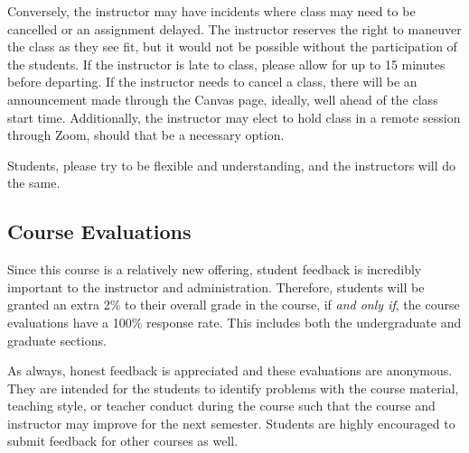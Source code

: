     Conversely, the instructor may have incidents where class may need to be cancelled or an assignment delayed. The instructor reserves the right to maneuver the class as they see fit, but it would not be possible without the participation of the students.
    If the instructor is late to class, please allow for up to 15 minutes before departing.
    If the instructor needs to cancel a class, there will be an announcement made through the Canvas page, ideally, well ahead of the class start time.
    Additionally, the instructor may elect to hold class in a remote session through Zoom, should that be a necessary option.
    
    Students, please try to be flexible and understanding, and the instructors will do the same.

    \subsection*{Course Evaluations}
    Since this course is a relatively new offering, student feedback is incredibly important to the instructor and administration.
    Therefore, students will be granted an extra 2\% to their overall grade in the course, if \emph{and only if}, the course evaluations have a 100\% response rate.
    This includes both the undergraduate and graduate sections.

    As always, honest feedback is appreciated and these evaluations are anonymous.
    They are intended for the students to identify problems with the course material, teaching style, or teacher conduct during the course such that the course and instructor may improve for the next semester.
    Students are highly encouraged to submit feedback for other courses as well. 

